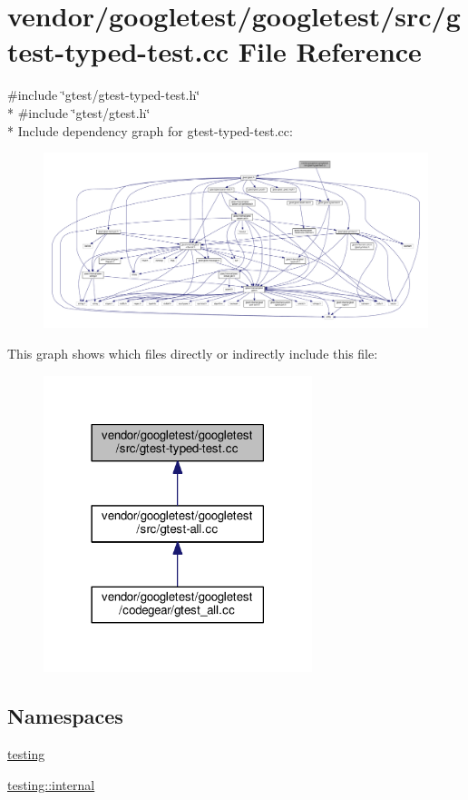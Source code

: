 \hypertarget{gtest-typed-test_8cc}{}\section{vendor/googletest/googletest/src/gtest-\/typed-\/test.cc File Reference}
\label{gtest-typed-test_8cc}
{\ttfamily \#include \char`\"{}gtest/gtest-\/typed-\/test.\+h\char`\"{}}\\*
{\ttfamily \#include \char`\"{}gtest/gtest.\+h\char`\"{}}\\*
Include dependency graph for gtest-\/typed-\/test.cc\+:
\nopagebreak
\begin{figure}[H]
\begin{center}
\leavevmode
\includegraphics[width=350pt]{gtest-typed-test_8cc__incl}
\end{center}
\end{figure}
This graph shows which files directly or indirectly include this file\+:
\nopagebreak
\begin{figure}[H]
\begin{center}
\leavevmode
\includegraphics[width=222pt]{gtest-typed-test_8cc__dep__incl}
\end{center}
\end{figure}
\subsection*{Namespaces}
\begin{DoxyCompactItemize}
\item 
 \hyperlink{namespacetesting}{testing}
\item 
 \hyperlink{namespacetesting_1_1internal}{testing\+::internal}
\end{DoxyCompactItemize}
